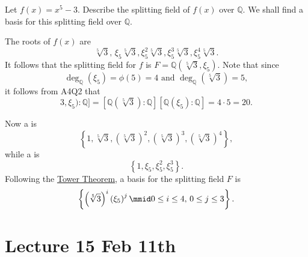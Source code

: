 \documentclass[notoc,notitlepage,nobib]{tufte-book}
\begin{document}
\begin{eg}
  Let $f(x) = x^5 - 3$. Describe the splitting field of $f(x)$ over $\mathbb{Q}$. We shall
  find a basis for this splitting field over $\mathbb{Q}$.

  The roots of $f(x)$ are
  \begin{equation*}
    \sqrt[5]{3}, \, \xi_5 \sqrt[5]{3}, \xi_5^2 \sqrt[5]{3}, \xi_5^3 \sqrt[5]{3}, \xi_5^4
    \sqrt[5]{3}.
  \end{equation*}
  It follows that the splitting field for $f$ is $F = \mathbb{Q}(\sqrt[5]{3}, \xi_5)$.
  Note that since
  \begin{equation*}
    \deg_{\mathbb{Q}}(\xi_5) = \phi(5) = 4 \text{ and } \deg_{\mathbb{Q}}(\sqrt[5]{3}) =
    5,
  \end{equation*}
  it follows from A4Q2 that
  \begin{equation*}
    [ \mathbb{Q}(\sqrt[5]{3}, \xi_5) : \mathbb{Q} ] = [ \mathbb{Q}(\sqrt[5]{3}) :
    \mathbb{Q} ][ \mathbb{Q}(\xi_5) : \mathbb{Q} ] = 4 \cdot 5 = 20.
  \end{equation*}

  Now a  is
  \begin{equation*}
    \left\{ 1, \sqrt[5]{3}, \left( \sqrt[5]{3} \right)^2, \left( \sqrt[5]{3} \right)^3,
    \left( \sqrt[5]{3} \right)^4 \right\},
  \end{equation*}
  while a  is
  \begin{equation*}
    \left\{ 1, \xi_5, \xi_5^2, \xi_5^3 \right\}.
  \end{equation*}
  Following the \hyperref[thm:tower_theorem]{Tower Theorem}, a basis for the splitting
  field $F$ is
  \begin{equation*}
    \left\{ \left( \sqrt[5]{3} \right)^i \left( \xi_5 \right)^j \mmid 0 \leq i \leq 4, \,
    0 \leq j \leq 3 \right\}.
  \end{equation*}
\end{eg}



\chapter{Lecture 15 Feb 11th}%
\label{chp:lecture_15_feb_11th}
\end{document}
